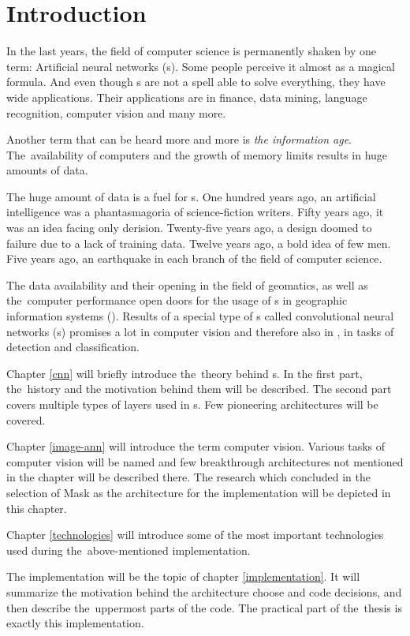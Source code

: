 \chapter{Introduction}
\label{intro}

In the last years, the field of computer science is permanently shaken by one 
term: Artificial neural networks (s). Some people perceive it almost as 
a magical formula. And even though s are not a spell able to solve 
everything, they have wide applications. Their applications are in finance, data 
mining, language recognition, computer vision and many more.

Another term that can be heard more and more is \textit{the information age}. 
The~availability of computers and the growth of memory limits results in huge 
amounts of data.

The huge amount of data is a fuel for s. One hundred years ago, an 
artificial intelligence was a phantasmagoria of science-fiction writers. Fifty 
years ago, it was an idea facing only derision. Twenty-five years ago, a design 
doomed to failure due to a lack of training data. Twelve years ago, a bold idea 
of few men. Five years ago, an earthquake in each branch of the field of 
computer science.

The data availability and their opening in the field of geomatics, as well as 
the~computer performance open doors for the usage of s in geographic 
information systems (). Results of a special type of s called 
convolutional neural networks (s) promises a lot in computer vision and 
therefore also in , in tasks of detection and classification.

Chapter \ref{cnn} will briefly introduce the~theory behind s. In the 
first part, the~history and the motivation behind them will be described. The 
second part covers multiple types of layers used in s. Few pioneering 
architectures will be covered.

Chapter \ref{image-ann} will introduce the term computer vision. Various tasks 
of computer vision will be named and few breakthrough architectures not 
mentioned in the  chapter will be described there. The research which 
concluded in the selection of Mask  as the architecture for the 
implementation will be depicted in this chapter.

Chapter \ref{technologies} will introduce some of the most important 
technologies used during
the~above-mentioned implementation.

The implementation will be the topic of chapter \ref{implementation}. It will 
summarize the motivation behind the architecture choose and code decisions, and 
then describe the~uppermost parts of the code. The practical part of the~thesis 
is exactly this implementation.

